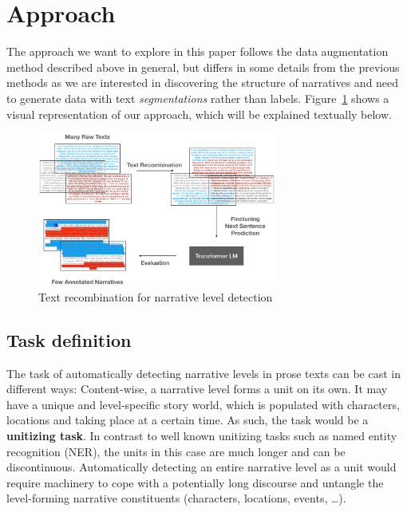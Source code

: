 \documentclass[10pt, a4paper]{article}
\begin{document}
\section{Approach}
\label{sec:workflow}

The approach we want to explore in this paper follows the  data augmentation method described above in general, but differs in some details from the previous methods as we are interested in discovering the structure of narratives and need to generate data with text \textit{segmentations} rather than labels. Figure~\ref{fig:workflow} shows a visual representation of our approach, which will be explained textually below.

\begin{figure}
    \centering
    \includegraphics[width=0.7\textwidth]{workflow.ps}
    \vspace{-1.5cm}
    \caption{Text recombination for narrative level detection}
    \label{fig:workflow}
\end{figure}



\subsection{Task definition}
\label{subsec:task}

The task of automatically detecting narrative levels in prose texts can be cast in different ways: Content-wise, a narrative level forms a unit on its own. It may have a unique and level-specific story world, which is populated with characters, locations and taking place at a certain time. As such, the task would be a \textbf{unitizing task}. In contrast to well known unitizing tasks such as named entity recognition (NER), the units in this case are much longer and can be discontinuous. Automatically detecting an entire narrative level as a unit would require machinery to cope with a potentially long discourse and untangle the level-forming narrative constituents (characters, locations, events, \dots). 
\end{document}
